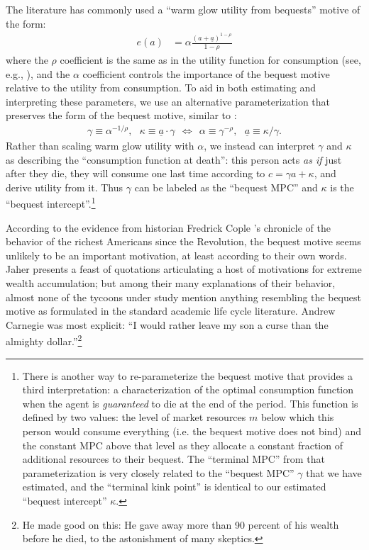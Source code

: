 \documentclass{article}
\newcommand{\CRRA}{\rho}
\newcommand{\cNrm}{c}
\newcommand{\aNrm}{a}
\newcommand{\bqstNrm}{e}
\begin{document}
The literature has commonly used a ``warm glow utility from bequests'' motive of the form:
\begin{align}
    \bqstNrm(a) & = \alpha\frac{(a+\underline{a})^{1-\CRRA}}{1-\CRRA}
\end{align}
where the $\CRRA$ coefficient is the same as in the utility function for consumption (see, e.g., \cite{deNardiBequest}), and the $\alpha$ coefficient controls the importance of the bequest motive relative to the utility from consumption. To aid in both estimating and interpreting these parameters, we use an alternative parameterization that preserves the form of the bequest motive, similar to \cite{Love2009}:
\begin{align}
    \gamma \equiv \alpha^{-1/\CRRA}, ~~~ \kappa \equiv \underline{a} \cdot \gamma ~~\Longleftrightarrow~~ \alpha \equiv \gamma^{-\CRRA}, ~~~ \underline{a} \equiv \kappa / \gamma.
\end{align}
Rather than scaling warm glow utility with $\alpha$, we instead can interpret $\gamma$ and $\kappa$ as describing the ``consumption function at death'': this person acts \textit{as if} just after they die, they will consume one last time according to $\cNrm = \gamma \aNrm + \kappa$, and derive utility from it. Thus $\gamma$ can be labeled as the ``bequest MPC'' and $\kappa$ is the ``bequest intercept''.\footnote{There is another way to re-parameterize the bequest motive that provides a third interpretation: a characterization of the optimal consumption function when the agent is \textit{guaranteed} to die at the end of the period. This function is defined by two values: the level of market resources $m$ below which this person would consume everything (i.e. the bequest motive does not bind) and the constant MPC above that level as they allocate a constant fraction of additional resources to their bequest. The ``terminal MPC'' from that parameterization is very closely related to the ``bequest MPC'' $\gamma$ that we have estimated, and the ``terminal kink point'' is identical to our estimated ``bequest intercept'' $\kappa$.}

According to the evidence from historian Fredrick Cople \cite{jaherGilded}'s chronicle of the behavior of the richest Americans since the Revolution, the bequest motive seems unlikely to be an important motivation, at least according to their own words.
Jaher presents a feast of quotations articulating a host of motivations for extreme wealth accumulation; but among their many explanations of their behavior, almost none of the tycoons under study mention anything resembling the bequest motive as formulated in the standard academic life cycle literature.
Andrew Carnegie was most explicit: ``I would rather leave my son a curse than the almighty dollar.''\footnote{He made good on this: He gave away more than 90 percent of his wealth before he died, to the astonishment of many skeptics.}
\end{document}
